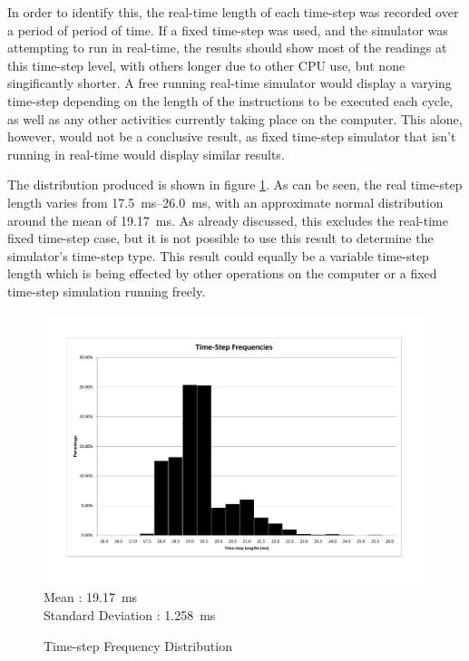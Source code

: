 \documentclass[10pt]{article}
\begin{document}
In order to identify this, the real-time length of each time-step was recorded
over a period of period of time.  If a fixed time-step was used, and the
simulator was attempting to run in real-time, the results should show most of
the readings at this time-step level, with others longer due to other \ac{CPU}
use, but none singificantly shorter.  A free running real-time simulator would
display a varying time-step depending on the length of the instructions to be
executed each cycle, as well as any other activities currently taking place on
the computer.  This alone, however, would not be a conclusive result, as fixed
time-step simulator that isn't running in real-time would display similar
results.

The distribution produced is shown in figure \ref{fig:timestepDistribution}.  As
can be seen, the real time-step length varies from
\SIrange{17.5}{26.0}{\milli\second}, with an approximate normal distribution
around the mean of \SI{19.17}{\milli\second}.  As already discussed, this
excludes the real-time fixed time-step case, but it is not possible to use this
result to determine the simulator's time-step type. This result could equally be
a variable time-step length which is being effected by other operations on the
computer or a fixed time-step simulation running freely.

\begin{figure}
 \includegraphics[width=\textwidth]{Images/time-step-length-distribution} \\
 Mean : \SI{19.17}{\milli\second} \\
 Standard Deviation : \SI{1.258}{\milli\second}

 \caption{Time-step Frequency Distribution}
 \label{fig:timestepDistribution}
\end{figure}
\end{document}
